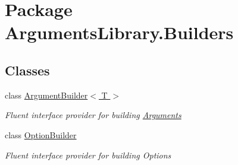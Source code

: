 \hypertarget{namespace_arguments_library_1_1_builders}{\section{Package Arguments\+Library.\+Builders}
\label{namespace_arguments_library_1_1_builders}
}
\subsection*{Classes}
\begin{DoxyCompactItemize}
\item 
class \hyperlink{class_arguments_library_1_1_builders_1_1_argument_builder_3_01_t_01_4}{Argument\+Builder$<$ T $>$}
\begin{DoxyCompactList}\small\item\em Fluent interface provider for building \hyperlink{class_arguments_library_1_1_arguments}{Arguments} \end{DoxyCompactList}\item 
class \hyperlink{class_arguments_library_1_1_builders_1_1_option_builder}{Option\+Builder}
\begin{DoxyCompactList}\small\item\em Fluent interface provider for building Options \end{DoxyCompactList}\end{DoxyCompactItemize}
